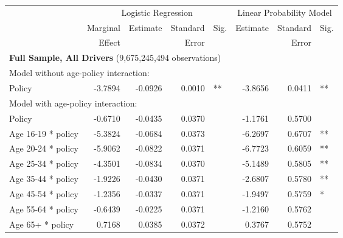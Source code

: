 
\begin{table}%
\centering 
\begin{tabular}{l r r r l r r l} 

\hline 
 
 & \multicolumn{4}{c}{Logistic Regression}  & \multicolumn{3}{c}{Linear Probability Model} \\ 

 \cmidrule(lr){2-5}\cmidrule(lr){6-8} 
 & Marginal & Estimate & Standard & Sig. & Estimate & Standard & Sig. \\ 
 &   Effect &          &  Error   &      &          &  Error   &     \\ 

\hline 
 
\multicolumn{7}{l}{\textbf{Full Sample, All Drivers} (9,675,245,494 observations)} \\ 

\hline
\multicolumn{7}{l}{Model without age-policy interaction: } \\ 
Policy                   &  -3.7894       &  -0.0926        &  0.0010       &   **       &  -3.8656        &  0.0411       &   **       \\ 
\hline
\multicolumn{7}{l}{Model with age-policy interaction: } \\ 
Policy                   &  -0.6710       &  -0.0435        &  0.0370       &            &  -1.1761        &  0.5700       &            \\ 
Age 16-19 * policy   &  -5.3824       &  -0.0684        &  0.0373       &            &  -6.2697        &  0.6707       &   **       \\ 
Age 20-24 * policy   &  -5.9062       &  -0.0822        &  0.0371       &            &  -6.7723        &  0.6059       &   **       \\ 
Age 25-34 * policy   &  -4.3501       &  -0.0834        &  0.0370       &            &  -5.1489        &  0.5805       &   **       \\ 
Age 35-44 * policy   &  -1.9226       &  -0.0430        &  0.0371       &            &  -2.6807        &  0.5780       &   **       \\ 
Age 45-54 * policy   &  -1.2356       &  -0.0337        &  0.0371       &            &  -1.9497        &  0.5759       &    *       \\ 
Age 55-64 * policy   &  -0.6439       &  -0.0225        &  0.0371       &            &  -1.2160        &  0.5762       &            \\ 
Age 65+ * policy   &  0.7168       &  0.0385        &  0.0372       &            &  0.3767        &  0.5752       &            \\ 


\end{tabular}
\end{table}
